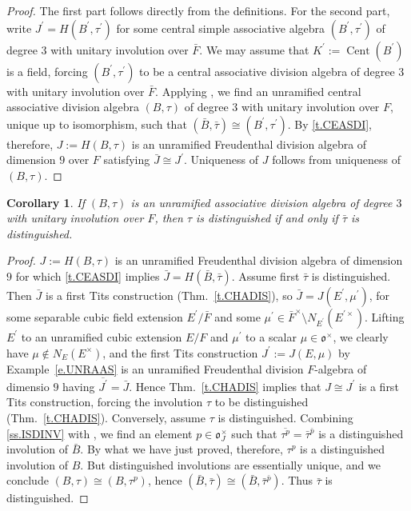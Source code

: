 \documentclass{amsart}
\newtheorem{cor}[equation]{Corollary}
\theoremstyle{definition} %
\theoremstyle{remark} %
\DeclareMathOperator{\Cent}{Cent}
\newcommand{\mfo}{\mathfrak{o}}
\renewcommand{\:}{\colon\,}
\numberwithin{equation}{section}
\begin{document}
\begin{proof}
The first part follows directly from the definitions. For the second part, write $J^\prime = H(B^\prime,\tau^\prime)$ for some central simple associative	algebra $(B^\prime,\tau^\prime)$ of degree $3$ with unitary involution over $\bar F$. We may assume that $K^\prime := \Cent(B^\prime)$ is a field, forcing $(B^\prime,\tau^\prime)$ to be a central associative division algebra of degree $3$ with unitary involution over $\bar F$. Applying \cite[Thm.~1]{MR0379620}, we find an unramified central associative division algebra $(B,\tau)$ of degree $3$ with unitary involution over $F$, unique up to isomorphism, such that $(\bar B,\bar\tau) \cong (B^\prime,\tau^\prime)$. By \ref{t.CEASDI}, therefore, $J := H(B,\tau)$ is an unramified Freudenthal division algebra of dimension $9$ over $F$ satisfying $\bar J \cong J^\prime$. Uniqueness of $J$ follows from uniqueness of $(B,\tau)$.
\end{proof}	

\begin{cor} \label{c.REDIIN}
If $(B,\tau)$ is an unramified associative division algebra of degree $3$ with unitary involution over $F$, then $\tau$ is distinguished if and only if $\bar\tau$ is distinguished.	
\end{cor}

\begin{proof}
$J := H(B,\tau)$ is an unramified Freudenthal division algebra of dimension $9$ for which \ref{t.CEASDI} implies $\bar J = H(\bar B,\bar\tau)$. Assume first $\bar\tau$ is distinguished. Then $\bar J$ is a first Tits construction (Thm.~\ref{t.CHADIS}), so $\bar J = J(E^\prime,\mu^\prime)$, for some separable cubic field extension $E^\prime/\bar F$ and some $\mu^\prime \in \bar F^\times \setminus N_{E^\prime}(E^{\prime\times})$. Lifting $E^\prime$ to an unramified cubic extension $E/F$ \cite[III, Thm.~2]{MR354618} and $\mu^\prime$ to a scalar $\mu \in \mfo^\times$, we clearly have $\mu \notin N_E(E^\times)$, and the first Tits construction $J^\prime := J(E,\mu)$ by Example~\ref{e.UNRAAS} is an unramified Freudenthal division $F$-algebra of dimensio $9$ having $\overline{J^\prime} = \bar J$. Hence Thm.~\ref{t.CHADIS} implies that $J \cong J^\prime$ is a first Tits construction, forcing the involution $\tau$ to be distinguished (Thm.~\ref{t.CHADIS}). Conversely, assume $\tau$ is distinguished. Combining \ref{ss.ISDINV} with \cite[Thm.~2.10]{MR2063796}, we find an element $p \in \mfo_J^\times$ such that $\overline{\tau^p} = \bar\tau^{\bar p}$ is a distinguished involution of $\bar B$. By what we have just proved, therefore, $\tau^p$ is a distinguished involution of $B$. But distinguished involutions are essentially unique, and we conclude $(B,\tau) \cong (B,\tau^p)$, hence $(\bar B,\bar\tau) \cong (\bar B,\bar\tau^{\bar p})$. Thus $\bar\tau$ is distinguished.
\end{proof}	
\end{document}
